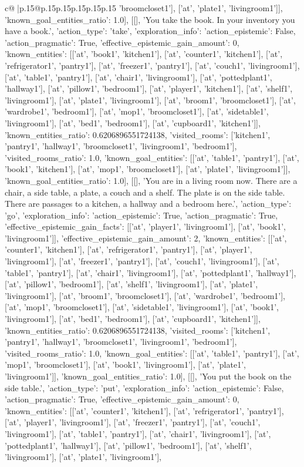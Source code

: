 \documentclass{article}
\begin{document}
{\begin{supertabular}{c@{$\;$}|p{.15\linewidth}@{}p{.15\linewidth}p{.15\linewidth}p{.15\linewidth}p{.15\linewidth}p{.15\linewidth}}
{{{'broomcloset1'], ['at', 'plate1', 'livingroom1']], 'known_goal_entities_ratio': 1.0}}], [[], 'You take the book. In your inventory you have a book.', {'action_type': 'take', 'exploration_info': {'action_epistemic': False, 'action_pragmatic': True, 'effective_epistemic_gain_amount': 0, 'known_entities': [['at', 'book1', 'kitchen1'], ['at', 'counter1', 'kitchen1'], ['at', 'refrigerator1', 'pantry1'], ['at', 'freezer1', 'pantry1'], ['at', 'couch1', 'livingroom1'], ['at', 'table1', 'pantry1'], ['at', 'chair1', 'livingroom1'], ['at', 'pottedplant1', 'hallway1'], ['at', 'pillow1', 'bedroom1'], ['at', 'player1', 'kitchen1'], ['at', 'shelf1', 'livingroom1'], ['at', 'plate1', 'livingroom1'], ['at', 'broom1', 'broomcloset1'], ['at', 'wardrobe1', 'bedroom1'], ['at', 'mop1', 'broomcloset1'], ['at', 'sidetable1', 'livingroom1'], ['at', 'bed1', 'bedroom1'], ['at', 'cupboard1', 'kitchen1']], 'known_entities_ratio': 0.6206896551724138, 'visited_rooms': ['kitchen1', 'pantry1', 'hallway1', 'broomcloset1', 'livingroom1', 'bedroom1'], 'visited_rooms_ratio': 1.0, 'known_goal_entities': [['at', 'table1', 'pantry1'], ['at', 'book1', 'kitchen1'], ['at', 'mop1', 'broomcloset1'], ['at', 'plate1', 'livingroom1']], 'known_goal_entities_ratio': 1.0}}], [[], 'You are in a living room now. There are a chair, a side table, a plate, a couch and a shelf. The plate is on the side table. There are passages to a kitchen, a hallway and a bedroom here.', {'action_type': 'go', 'exploration_info': {'action_epistemic': True, 'action_pragmatic': True, 'effective_epistemic_gain_facts': [['at', 'player1', 'livingroom1'], ['at', 'book1', 'livingroom1']], 'effective_epistemic_gain_amount': 2, 'known_entities': [['at', 'counter1', 'kitchen1'], ['at', 'refrigerator1', 'pantry1'], ['at', 'player1', 'livingroom1'], ['at', 'freezer1', 'pantry1'], ['at', 'couch1', 'livingroom1'], ['at', 'table1', 'pantry1'], ['at', 'chair1', 'livingroom1'], ['at', 'pottedplant1', 'hallway1'], ['at', 'pillow1', 'bedroom1'], ['at', 'shelf1', 'livingroom1'], ['at', 'plate1', 'livingroom1'], ['at', 'broom1', 'broomcloset1'], ['at', 'wardrobe1', 'bedroom1'], ['at', 'mop1', 'broomcloset1'], ['at', 'sidetable1', 'livingroom1'], ['at', 'book1', 'livingroom1'], ['at', 'bed1', 'bedroom1'], ['at', 'cupboard1', 'kitchen1']], 'known_entities_ratio': 0.6206896551724138, 'visited_rooms': ['kitchen1', 'pantry1', 'hallway1', 'broomcloset1', 'livingroom1', 'bedroom1'], 'visited_rooms_ratio': 1.0, 'known_goal_entities': [['at', 'table1', 'pantry1'], ['at', 'mop1', 'broomcloset1'], ['at', 'book1', 'livingroom1'], ['at', 'plate1', 'livingroom1']], 'known_goal_entities_ratio': 1.0}}], [[], 'You put the book on the side table.', {'action_type': 'put', 'exploration_info': {'action_epistemic': False, 'action_pragmatic': True, 'effective_epistemic_gain_amount': 0, 'known_entities': [['at', 'counter1', 'kitchen1'], ['at', 'refrigerator1', 'pantry1'], ['at', 'player1', 'livingroom1'], ['at', 'freezer1', 'pantry1'], ['at', 'couch1', 'livingroom1'], ['at', 'table1', 'pantry1'], ['at', 'chair1', 'livingroom1'], ['at', 'pottedplant1', 'hallway1'], ['at', 'pillow1', 'bedroom1'], ['at', 'shelf1', 'livingroom1'], ['at', 'plate1', 'livingroom1'], }}}
\end{supertabular}}
\end{document}
